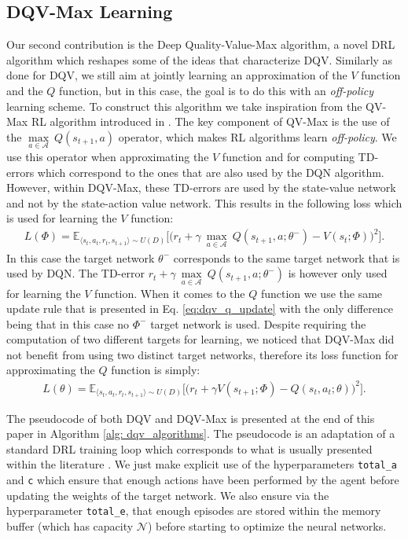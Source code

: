 \subsection{DQV-Max Learning}
Our second contribution is the Deep Quality-Value-Max algorithm, a novel DRL algorithm which reshapes some of the ideas that characterize DQV. Similarly as done for DQV, we still aim at jointly learning an approximation of the $V$ function and the $Q$ function, but in this case, the goal is to do this with an \textit{off-policy} learning scheme. To construct this algorithm we take inspiration from the QV-Max RL algorithm introduced in \cite{wiering2009qv}. The key component of QV-Max is the use of the $\underset{a\in \mathcal{A}}{\max}\: Q(s_{t+1}, a)$ operator, which makes RL algorithms learn \textit{off-policy}. We use this operator when approximating the $V$ function and for computing TD-errors which correspond to the ones that are also used by the DQN algorithm. However, within DQV-Max, these TD-errors are used by the state-value network and not by the state-action value network. This results in the following loss which is used for learning the $V$ function:
\begin{multline}
L(\Phi) = \mathds{E}_{\langle s_{t},a_{t},r_{t},s_{t+1}\rangle\sim U(D)} \bigg[\big(r_{t} + \gamma \: \underset{a\in \mathcal{A}}{\max}\: Q(s_{t+1}, a; \theta^{-}) - V(s_{t}; \Phi)\big)^{2}\bigg].
\label{eq:dqv_max_v}
\end{multline}
In this case the target network $\theta^{-}$ corresponds to the same target network that is used by DQN. The TD-error $r_{t} + \gamma \: \underset{a\in \mathcal{A}}{\max}\: Q(s_{t+1}, a; \theta^{-})$ is however only used for learning the $V$ function. When it comes to the $Q$ function we use the same update rule that is presented in Eq. \ref{eq:dqv_q_update} with the only difference being that in this case no $\Phi^{-}$ target network is used. Despite requiring the computation of two different targets for learning, we noticed that DQV-Max did not benefit from using two distinct target networks, therefore its loss function for approximating the $Q$ function is simply:
\begin{multline}
    L(\theta) = \mathds{E}_{\langle s_{t},a_{t},r_{t},s_{t+1}\rangle\sim U(D)} \bigg[\big(r_{t} + \gamma V(s_{t+1}; \Phi) - Q(s_{t}, a_{t}; \theta)\big)^{2}\bigg].
    \label{eq:dqv_max_q}
\end{multline}

The pseudocode of both DQV and DQV-Max is presented at the end of this paper in Algorithm \ref{alg: dqv_algorithms}. The pseudocode is an adaptation of a standard DRL training loop which corresponds to what is usually presented within the literature \cite{mnih2015human}. We just make explicit use of the hyperparameters \texttt{total\_a} and \texttt{c} which ensure that enough actions have been performed by the agent before updating the weights of the target network. We also ensure via the hyperparameter \texttt{total\_e}, that enough episodes are stored within the memory buffer (which has capacity $\mathcal{N}$) before starting to optimize the neural networks. 

